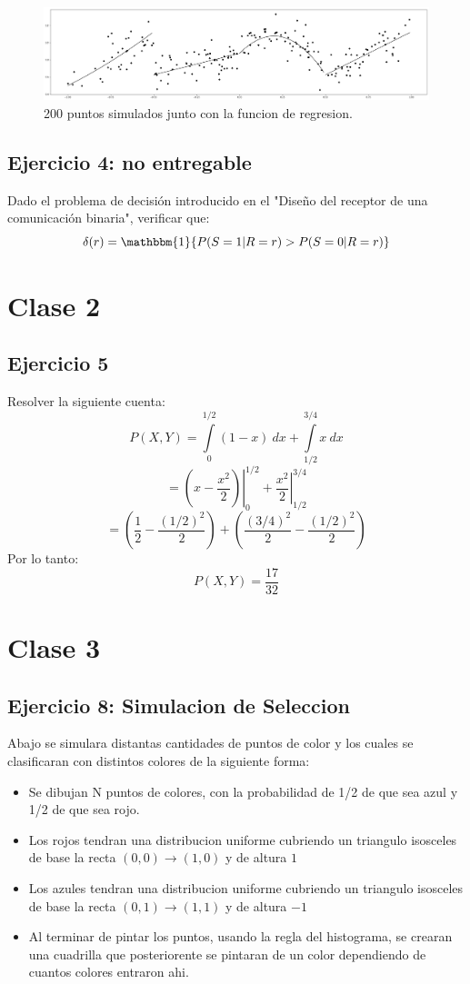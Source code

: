 \documentclass[12pt, a4paper]{article}
\begin{document}
\begin{figure}[H]
    \includegraphics[width = \textwidth]{grafico}
    \caption{200 puntos simulados junto con la funcion de regresion.}
    \label{}
\end{figure}
% 
\subsection{Ejercicio 4: no entregable}
Dado el problema de decisión introducido en el "Diseño del receptor de una comunicación binaria", verificar que:
		$$\delta(r) = \mathbbm{1} \{ P(S=1|R=r) > P(S=0|R=r)\}$$
\section{Clase 2}
\subsection{Ejercicio 5}
Resolver la siguiente cuenta:
		$$P(X,Y) = \int\limits_0^{1/2}(1-x)\ dx + \int\limits_{1/2}^{3/4} x\ dx$$
		$$= \left.\left(x-\frac{x^2}{2}\right)\right|_{0}^{1/2}+\left. \frac{x^2}{2}\right|_{1/2}^{3/4}$$
		$$= \left(\frac{1}{2}-\frac{(1/2)^2}{2}\right) + \left(\frac{(3/4)^2}{2} - \frac{(1/2)^2}{2}\right)$$
Por lo tanto:
		$$P(X,Y) = \frac{17}{32}$$

\section{Clase 3}
\subsection{Ejercicio 8: Simulacion de Seleccion}

Abajo se simulara distantas cantidades de puntos de color y los cuales se clasificaran con distintos colores de la siguiente forma:
\begin{itemize}
	\item Se dibujan N puntos de colores, con la probabilidad de 1/2 de que sea azul y 1/2 de que sea rojo.
	\item Los rojos tendran una distribucion uniforme cubriendo un triangulo isosceles de base la recta $(0,0)\rightarrow(1,0)$ y de altura $1$
	\item Los azules tendran una distribucion uniforme cubriendo un triangulo isosceles de base la recta $(0,1)\rightarrow(1,1)$ y de altura $-1$
	\item Al terminar de pintar los puntos, usando la regla del histograma, se crearan una cuadrilla que posteriorente se pintaran de un color dependiendo de cuantos colores entraron ahi.
\end{itemize}
\end{document}
